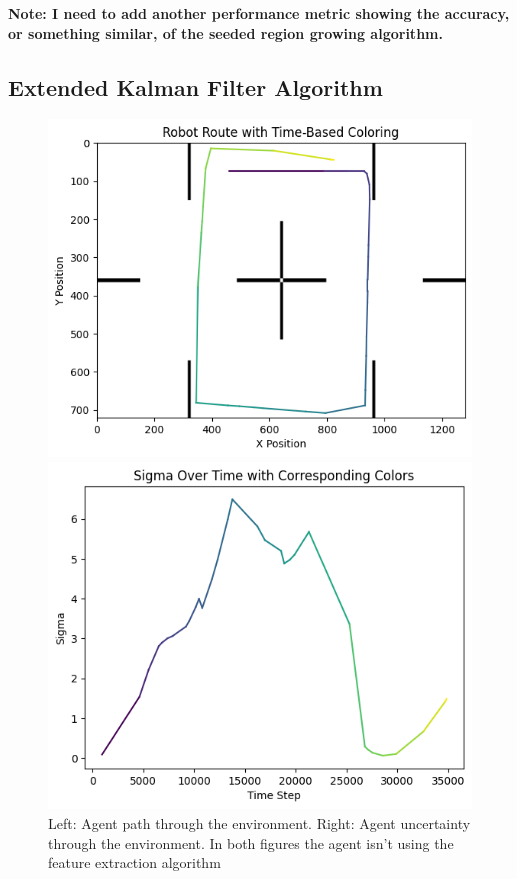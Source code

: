 \documentclass[12pt]{article}
\begin{document}
\textbf{Note: I need to add another performance metric showing the accuracy, or something similar, of the seeded region
growing algorithm.}\\

\subsection{Extended Kalman Filter Algorithm}

\begin{figure}[h]
    \centering
    \begin{minipage}{0.45\textwidth}
        \centering
        \includegraphics[width=\linewidth]{EKFgraph1}
    \end{minipage}
    \begin{minipage}{0.45\textwidth}
        \centering
        \includegraphics[width=\linewidth]{EKFgraph2}
    \end{minipage}
    \caption[Short caption]{Left: Agent path through the environment. Right: Agent uncertainty through the environment. In both figures
    the agent isn't using the feature extraction algorithm}
    \label{fig:ekf_graphs}
\end{figure}
\end{document}
